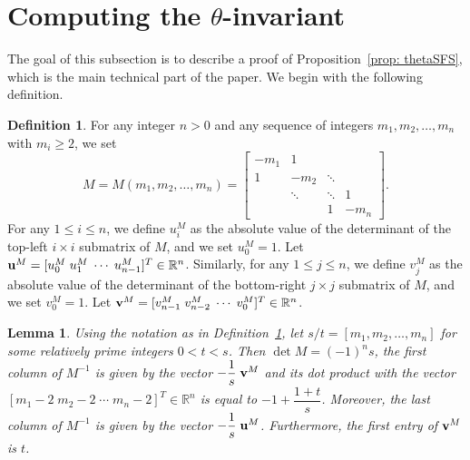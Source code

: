 \documentclass[11pt]{amsart}
\theoremstyle{plain}
\newtheorem{lemma}[theorem]{Lemma}
\theoremstyle{definition}
\newtheorem{definition}[theorem]{Definition}
\theoremstyle{remark}
\numberwithin{theorem}{section}
\begin{document}
\section{Computing the $\theta$-invariant}   \label{subsec: theta} 


The goal of this subsection is to describe a proof of Proposition~\ref{prop: thetaSFS}, which is the main technical part of the paper. We begin with the following definition. 


\begin{definition} \label{def: det} For any integer $n>0$ and any sequence of integers $m_1, m_2, \ldots, m_n$ with $m_i \geq 2$, we set $$M=M(m_1, m_2, \ldots, m_n)= \left[\begin{array}{cccc}
 -m_1 & 1 & &   \\
1 & -m_2 & \ddots & \\
 & \ddots & \ddots & 1 \\
 & & 1 & -m_n 
\end{array}\right].$$  For any $1 \leq i \leq n$, we define $u^M_i$ as the absolute value of the determinant of the top-left $i \times i$ submatrix of $M$, and we set  $u^M_0=1$.  Let ${\bf u}^M=[u^M_0 \; u^M_1 \; \cdots \; u^M_{n-1}]^T \in \mathbb{R}^n$. Similarly, for any $1 \leq j \leq n$, we define $v^M_j$ as the absolute value of the determinant of the bottom-right $j \times j$ submatrix of $M$, and we set $v^M_0=1$. Let ${\bf v}^M=[v^M_{n-1} \; v^M_{n-2} \; \cdots \; v^M_0]^T \in \mathbb{R}^n$. 
\end{definition}



\begin{lemma} \label{lem: firstrow} 
Using the notation as in Definition~\ref{def: det}, let ${s}/{t}=[m_1, m_2, \ldots, m_n]$ for some relatively prime integers $0 < t < s$. Then $\det M = (-1)^n s$,   the first column of $M^{-1}$ is given by the vector  $-\dfrac{1}{s}   \; {\bf v}^M$ and its dot product with the vector $[m_1-2 \; m_2-2 \; \cdots \; m_n-2]^T \in  \mathbb{R}^n$ is equal to $-1+ \dfrac{1+t}{s}$. Moreover,  the last column of $M^{-1}$ is given by the vector  $-\dfrac{1}{s}   \; {\bf u}^M$. Furthermore, the first entry of  ${\bf v}^M$ is $t$. 
\end{lemma} 
\end{document}

